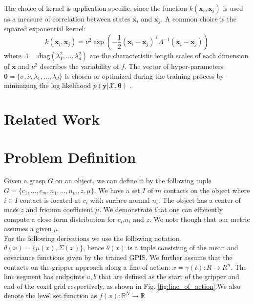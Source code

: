 \documentclass[letterpaper, 10 pt, conference]{ieeeconf}  %
\newcommand{\by}{\mathbf{y}}
\newcommand{\bx}{\mathbf{x}}
\newcommand{\mX}{\mathcal{X}}
\begin{document}
The choice of kernel is application-specific, since the function $k(\bx_i,\bx_j)$ is used as a measure of correlation between states $\bx_i$ and $\bx_j$. A common choice is the squared exponential kernel:
\begin{equation}
k(\bx_i,\bx_j) = \nu^2\exp(-\frac{1}{2}(\bx_i - \bx_j)^{\intercal}\Lambda^{-1}(\bx_i - \bx_j))
\end{equation}
where $\Lambda= \text{diag}(\lambda_1^2,\ldots,\lambda_d^2)$ are the characteristic length scales of each dimension of $\bx$ and $\nu^2$ describes the variability of $f$. The vector of hyper-parameters $\boldsymbol{\theta} = \{\sigma,\nu,\lambda_1,\ldots,\lambda_d\}$ is chosen or optimized during the training process by minimizing the log likelihood $p(\by|\mX,\boldsymbol{\theta})$ \cite{rasmussen2006}.

\section{Related Work}

\section{Problem Definition}
Given a grasp $G$ on an object, we can define it by the following tuple $G = \lbrace c_1,...,c_m,n_1,...,n_m,z,\mu\rbrace$. We have a set $I$ of $m$ contacts on the object where $i \in I$ contact is located at $c_i$ with surface normal $n_i$. The object has a center of mass $z$ and friction coefficient $\mu$. We demonstrate that one can efficiently compute a close form distribution for $c_i$,$n_i$ and $z$. We note though that our metric assumes a given $\mu$. \\

 For the following derivations we use the following notation. $\theta(x) = \lbrace \mu(x),\Sigma(x) \rbrace$, hence $\theta(x)$ is a tuple consisting of the mean and covariance functions given by the trained GPIS. We further assume that the contacts on the gripper approach along a line of action: $x = \gamma(t): R \rightarrow R^n$. The line segment has endpoints $a,b$ that are defined as the start of the gripper and end of the voxel grid respectively, as shown in Fig. \ref{fig:line_of_action}.We also denote the level set function as $f(x): \mathbb{R}^N \rightarrow \mathbb{R}$ 
\end{document}
